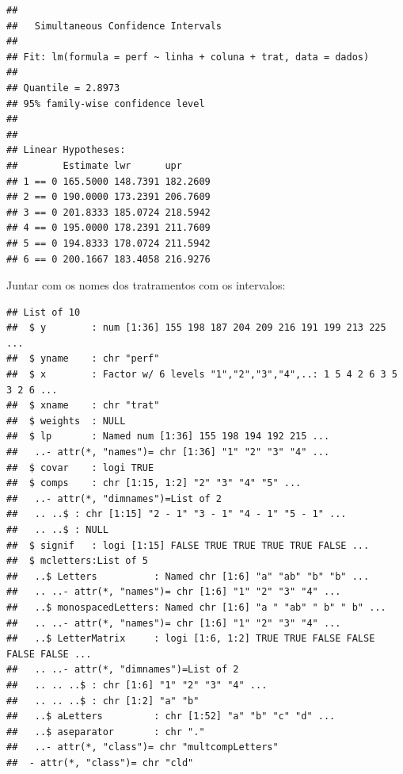 \documentclass[
]{book}
\newenvironment{Shaded}{\begin{snugshade}}{\end{snugshade}}
\newcommand{\KeywordTok}[1]{\textcolor[rgb]{0.13,0.29,0.53}{\textbf{#1}}}
\newcommand{\NormalTok}[1]{#1}
\newcommand{\OperatorTok}[1]{\textcolor[rgb]{0.81,0.36,0.00}{\textbf{#1}}}
\newcommand{\StringTok}[1]{\textcolor[rgb]{0.31,0.60,0.02}{#1}}
\begin{document}
\begin{verbatim}
## 
##   Simultaneous Confidence Intervals
## 
## Fit: lm(formula = perf ~ linha + coluna + trat, data = dados)
## 
## Quantile = 2.8973
## 95% family-wise confidence level
##  
## 
## Linear Hypotheses:
##        Estimate lwr      upr     
## 1 == 0 165.5000 148.7391 182.2609
## 2 == 0 190.0000 173.2391 206.7609
## 3 == 0 201.8333 185.0724 218.5942
## 4 == 0 195.0000 178.2391 211.7609
## 5 == 0 194.8333 178.0724 211.5942
## 6 == 0 200.1667 183.4058 216.9276
\end{verbatim}

Juntar com os nomes dos tratramentos com os intervalos:

\begin{Shaded}
\end{Shaded}

\begin{verbatim}
## List of 10
##  $ y        : num [1:36] 155 198 187 204 209 216 191 199 213 225 ...
##  $ yname    : chr "perf"
##  $ x        : Factor w/ 6 levels "1","2","3","4",..: 1 5 4 2 6 3 5 3 2 6 ...
##  $ xname    : chr "trat"
##  $ weights  : NULL
##  $ lp       : Named num [1:36] 155 198 194 192 215 ...
##   ..- attr(*, "names")= chr [1:36] "1" "2" "3" "4" ...
##  $ covar    : logi TRUE
##  $ comps    : chr [1:15, 1:2] "2" "3" "4" "5" ...
##   ..- attr(*, "dimnames")=List of 2
##   .. ..$ : chr [1:15] "2 - 1" "3 - 1" "4 - 1" "5 - 1" ...
##   .. ..$ : NULL
##  $ signif   : logi [1:15] FALSE TRUE TRUE TRUE TRUE FALSE ...
##  $ mcletters:List of 5
##   ..$ Letters          : Named chr [1:6] "a" "ab" "b" "b" ...
##   .. ..- attr(*, "names")= chr [1:6] "1" "2" "3" "4" ...
##   ..$ monospacedLetters: Named chr [1:6] "a " "ab" " b" " b" ...
##   .. ..- attr(*, "names")= chr [1:6] "1" "2" "3" "4" ...
##   ..$ LetterMatrix     : logi [1:6, 1:2] TRUE TRUE FALSE FALSE FALSE FALSE ...
##   .. ..- attr(*, "dimnames")=List of 2
##   .. .. ..$ : chr [1:6] "1" "2" "3" "4" ...
##   .. .. ..$ : chr [1:2] "a" "b"
##   ..$ aLetters         : chr [1:52] "a" "b" "c" "d" ...
##   ..$ aseparator       : chr "."
##   ..- attr(*, "class")= chr "multcompLetters"
##  - attr(*, "class")= chr "cld"
\end{verbatim}
\end{document}
